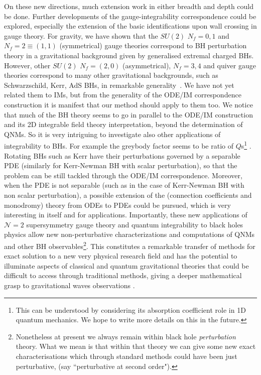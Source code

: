 \documentclass[11pt,a4paper]{elsarticle}
\numberwithin{figure}{section}
\numberwithin{table}{section}
\begin{document}
On these new directions, much extension work in either breadth and depth could be done. Further developments of the gauge-integrability correspondence could be explored, especially the extension of the basic identifications upon wall crossing in gauge theory. For gravity, we have shown that the $SU(2)$ $N_f=0,1$ and $N_f=2\equiv(1,1)$ (symmetrical) gauge theories correspond to BH perturbation theory in a gravitational background given by generalised extremal charged BHs. However, other $SU(2)$ $N_f=(2,0)$ (asymmetrical), $N_f=3,4$ and quiver gauge theories correspond to many other gravitational backgrounds, such as Schwarzschild, Kerr, AdS BHs, in remarkable generality~\cite{AminovGrassiHatsuda:2020,BianchiConsoliGrilloMorales:2021b}. We have not yet related them to IMs, but from the generality of the ODE/IM correspondence construction it is manifest that our method should apply to them too. 
We notice that much of the BH theory seems to go in parallel to the ODE/IM construction and its 2D integrable field theory interpretation, beyond the determination of QNMs. So it is very intriguing to investigate also other applications of integrability to BHs. For example the greybody factor seems to be ratio of $Q$s\footnote{This can be understood by considering its absorption coefficient role in 1D quantum mechanics. We hope to write more details on this in the future.} \cite{BonelliIossaLichtigTanzini:2021}. Rotating BHs such as Kerr have their perturbations governed by a separable PDE (similarly for Kerr-Newman BH with scalar perturbation), so that the problem can be still tackled through the ODE/IM correspondence. Moreover, when the PDE is not separable (such as in the case of Kerr-Newman BH with non scalar perturbation), a possible extension of the (connection coefficients and monodromy) theory from ODEs to PDEs could be pursued, which is very interesting in itself and for applications. Importantly, these new applications of $\mathcal{N}=2$ supersymmetry gauge theory and quantum integrability to black holes physics allow new non-perturbative characterizations and computations of QNMs  and other BH observables\footnote{Nonetheless at present we always remain within black hole \textit{perturbation} theory. What we mean is that within that theory we can give some new exact characterisations which through standard methods could have been just perturbative, (say ``perturbative at second order").}. This constitutes a remarkable transfer of methods for exact solution to a new very physical research field and has the potential to illuminate aspects of classical and quantum gravitational theories that could be difficult to access through traditional methods, giving a deeper mathematical grasp to gravitational waves observations \cite{LIGOScientific:2016,CardosoPani:2017,BianchiConsoliGrilloMorales:2021}. 
\end{document}
